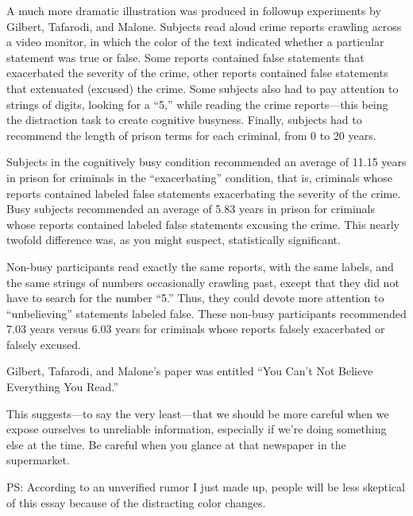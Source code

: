 {
 A much more dramatic illustration was produced in followup
experiments by Gilbert, Tafarodi, and Malone.
Subjects read aloud crime reports crawling across a video monitor, in
which the color of the text indicated whether a particular statement
was true or false. Some reports contained false statements that
exacerbated the severity of the crime, other reports contained false
statements that extenuated (excused) the crime. Some subjects also had
to pay attention to strings of digits, looking for a
``5,'' while reading the crime
reports---this being the distraction task to create cognitive busyness.
Finally, subjects had to recommend the length of prison terms for each
criminal, from 0 to 20 years.}

{
 Subjects in the cognitively busy condition recommended an average
of 11.15 years in prison for criminals in the
``exacerbating'' condition, that is,
criminals whose reports contained labeled false statements exacerbating
the severity of the crime. Busy subjects recommended an average of 5.83
years in prison for criminals whose reports contained labeled false
statements excusing the crime. This nearly twofold difference was, as
you might suspect, statistically significant.}

{
 Non-busy participants read exactly the same reports, with the same
labels, and the same strings of numbers occasionally crawling past,
except that they did not have to search for the number
``5.'' Thus, they could devote more
attention to ``unbelieving''
statements labeled false. These non-busy participants recommended 7.03
years versus 6.03 years for criminals whose reports falsely exacerbated
or falsely excused.}

{
 Gilbert, Tafarodi, and Malone's paper was entitled
``You Can't Not Believe Everything You
Read.''}

{
 This suggests---to say the very least---that we should be more
careful when we expose ourselves to unreliable information, especially
if we're doing something else at the time. Be careful
when you glance at that newspaper in the supermarket.}

{
 PS: According to an unverified rumor I just made up, people will
be less skeptical of this essay because of the distracting color
changes.}

\myendsectiontext


\bigskip


